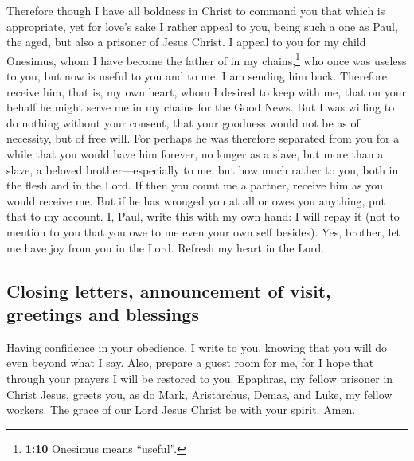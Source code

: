  Therefore though I have all boldness in Christ to command
you that which is appropriate,  yet for love's sake I
rather appeal to you, being such a one as Paul, the aged, but also a
prisoner of Jesus Christ.  I appeal to you for my child
Onesimus, whom I have become the father of in my chains,\footnote{\textbf{1:10}
  Onesimus means ``useful''.}  who once was useless to
you, but now is useful to you and to me.  I am sending
him back. Therefore receive him, that is, my own heart, 
whom I desired to keep with me, that on your behalf he might serve me in
my chains for the Good News.  But I was willing to do
nothing without your consent, that your goodness would not be as of
necessity, but of free will.  For perhaps he was
therefore separated from you for a while that you would have him
forever,  no longer as a slave, but more than a slave, a
beloved brother---especially to me, but how much rather to you, both in
the flesh and in the Lord.  If then you count me a
partner, receive him as you would receive me.  But if he
has wronged you at all or owes you anything, put that to my account.
 I, Paul, write this with my own hand: I will repay it
(not to mention to you that you owe to me even your own self besides).
 Yes, brother, let me have joy from you in the Lord.
Refresh my heart in the Lord.

\hypertarget{closing-letters-announcement-of-visit-greetings-and-blessings}{%
\subsection{Closing letters, announcement of visit, greetings and
blessings}\label{closing-letters-announcement-of-visit-greetings-and-blessings}}

 Having confidence in your obedience, I write to you,
knowing that you will do even beyond what I say.  Also,
prepare a guest room for me, for I hope that through your prayers I will
be restored to you.  Epaphras, my fellow prisoner in
Christ Jesus, greets you,  as do Mark, Aristarchus,
Demas, and Luke, my fellow workers.  The grace of our
Lord Jesus Christ be with your spirit. Amen.
